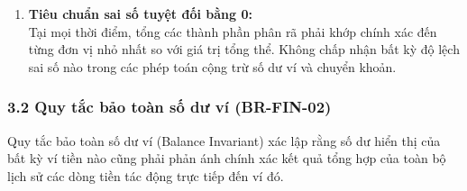 \documentclass[11pt,a4paper]{article}
\providecommand{\tightlist}{
  \setlength{\itemsep}{0pt}\setlength{\parskip}{0pt}}
\begin{document}
\begin{enumerate}
  \begin{itemize}
  \tightlist
  \item
    Đơn vị tiền tệ chính (VNĐ): Dữ liệu lưu trữ và hiển thị cuối cùng có
    scale bằng 0 (số nguyên đồng) hoặc scale bằng 2 khi lưu trữ nội bộ
    chuẩn quốc tế.
  \item
    Các phép tính tỷ lệ, lãi suất và NAV: Các biến số trung gian (lãi
    suất năm, tỷ lệ hoàn thành mục tiêu, đơn giá NAV) phải duy trì scale
    tối thiểu từ 4 đến 6 chữ số thập phân để bảo đảm độ mịn của phép
    tính.
  \item
    Chế độ làm tròn: Khi bắt buộc phải làm tròn số trong các phép chia
    không hết (\texttt{BigDecimal.divide}), hệ thống phải chỉ định tường
    minh chế độ làm tròn \texttt{RoundingMode.HALF\_EVEN}
    (Banker\textquotesingle s Rounding, ưu tiên làm tròn về số chẵn gần
    nhất nhằm triệt tiêu độ lệch thống kê tích lũy) hoặc
    \texttt{RoundingMode.HALF\_UP} (làm tròn số học truyền thống). Tuyệt
    đối cấm thực hiện phép chia \texttt{BigDecimal} mà không chỉ định
    scale và \texttt{RoundingMode} vì sẽ gây ngoại lệ
    \texttt{ArithmeticException} khi gặp số thập phân vô hạn tuần hoàn.
  \end{itemize}
\item
  \textbf{Tiêu chuẩn sai số tuyệt đối bằng 0:}\\
  Tại mọi thời điểm, tổng các thành phần phân rã phải khớp chính xác đến
  từng đơn vị nhỏ nhất so với giá trị tổng thể. Không chấp nhận bất kỳ
  độ lệch sai số nào trong các phép toán cộng trừ số dư ví và chuyển
  khoản.
\end{enumerate}

\newpage

\subsubsection{3.2 Quy tắc bảo toàn số dư ví
(BR-FIN-02)}\label{32-quy-tux1eafc-bux1ea3o-touxe0n-sux1ed1-dux1b0-vuxed-br-fin-02}

Quy tắc bảo toàn số dư ví (Balance Invariant) xác lập rằng số dư hiển
thị của bất kỳ ví tiền nào cũng phải phản ánh chính xác kết quả tổng hợp
của toàn bộ lịch sử các dòng tiền tác động trực tiếp đến ví đó.
\end{document}
